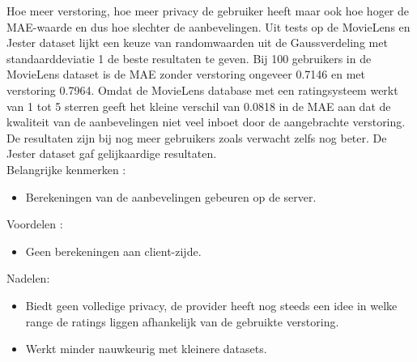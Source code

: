 Hoe meer verstoring, hoe meer privacy de gebruiker heeft maar ook hoe hoger de MAE-waarde en dus hoe slechter de aanbevelingen. Uit tests op de MovieLens en Jester dataset lijkt een keuze van randomwaarden uit de Gaussverdeling met standaarddeviatie 1 de beste resultaten te geven. Bij 100 gebruikers in de MovieLens dataset is de MAE zonder verstoring ongeveer 0.7146 en met verstoring 0.7964. Omdat de MovieLens database met een ratingsysteem werkt van 1 tot 5 sterren geeft het kleine verschil van 0.0818 in de MAE aan dat de kwaliteit van de aanbevelingen niet veel inboet door de aangebrachte verstoring.  De resultaten zijn bij nog meer gebruikers zoals verwacht zelfs nog beter. De Jester dataset gaf gelijkaardige resultaten.\\

Belangrijke kenmerken :
\begin{itemize}
 
\item Berekeningen van de aanbevelingen gebeuren op de server.
\end{itemize}
Voordelen : 
\begin{itemize}
\item Geen berekeningen aan client-zijde.
\end{itemize}
Nadelen:
\begin{itemize}
\item Biedt geen volledige privacy, de provider heeft nog steeds een idee in welke range de ratings liggen afhankelijk van de gebruikte verstoring. 
\item Werkt minder nauwkeurig met kleinere datasets.

\end{itemize}

